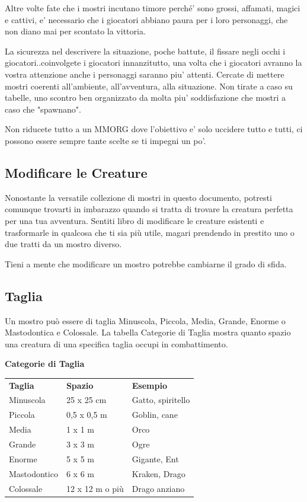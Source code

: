 \begin{multicols}{2}
Altre volte fate che i mostri incutano timore perché' sono grossi, affamati, magici e cattivi, e' necessario che i giocatori abbiano paura per i loro personaggi, che non diano mai per scontato la vittoria.

La sicurezza nel descrivere la situazione, poche battute, il fissare negli occhi i giocatori..coinvolgete i giocatori innanzitutto, una volta che i giocatori avranno la vostra attenzione anche i personaggi saranno piu' attenti. Cercate di mettere mostri coerenti all'ambiente, all'avventura, alla situazione. Non tirate a caso su tabelle, uno scontro ben organizzato da molta piu' soddisfazione che mostri a caso che "spawnano".

Non riducete tutto a un MMORG dove l'obiettivo e' solo uccidere tutto e tutti, ci possono essere sempre tante scelte se ti impegni un po'.

\subsection{Modificare le Creature}

Nonostante la versatile collezione di mostri in questo documento, potresti comunque trovarti in imbarazzo quando si tratta di trovare la creatura perfetta per una tua avventura. Sentiti libro di modificare le creature esistenti e trasformarle in qualcosa che ti sia più utile, magari prendendo in prestito uno o due tratti da un mostro diverso.

Tieni a mente che modificare un mostro potrebbe cambiarne il grado di sfida. 

\subsection{Taglia}

Un mostro può essere di taglia Minuscola, Piccola, Media, Grande, Enorme o Mastodontica e Colossale. La tabella Categorie di Taglia mostra quanto spazio una creatura di una specifica taglia occupi in combattimento.

\medskip

\textbf{Categorie di Taglia}

\begin{tabularx}{0.45\textwidth}{llX}
\toprule
\textbf{Taglia}& \textbf{Spazio} & \textbf{Esempio}\\
Minuscola & 25 x 25 cm& Gatto, spiritello\\
Piccola & 0,5 x 0,5 m & Goblin, cane\\
Media & 1 x 1 m & Orco\\
Grande & 3 x 3 m& Ogre\\
Enorme & 5 x 5 m & Gigante, Ent\\
Mastodontico & 6 x 6 m&Kraken, Drago\\
Colossale & 12 x 12 m o più&Drago anziano\\
\end{tabularx}


\end{multicols}
